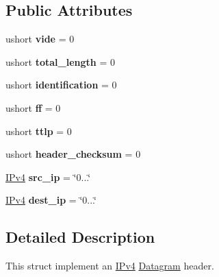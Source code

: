 \subsection*{Public Attributes}
\begin{DoxyCompactItemize}
\item 
ushort {\bfseries vide} = 0\hypertarget{structip_1_1Header_a105b752c949ecc83a6c64dec53b51e96}{}\label{structip_1_1Header_a105b752c949ecc83a6c64dec53b51e96}

\item 
ushort {\bfseries total\+\_\+length} = 0\hypertarget{structip_1_1Header_ae3ae0942baa2544afa8b86b9677ce464}{}\label{structip_1_1Header_ae3ae0942baa2544afa8b86b9677ce464}

\item 
ushort {\bfseries identification} = 0\hypertarget{structip_1_1Header_a6a1db0df8e25a4bcc0f2df9549bc30b1}{}\label{structip_1_1Header_a6a1db0df8e25a4bcc0f2df9549bc30b1}

\item 
ushort {\bfseries ff} = 0\hypertarget{structip_1_1Header_a9c79b047f8384c0e78055dda3271598f}{}\label{structip_1_1Header_a9c79b047f8384c0e78055dda3271598f}

\item 
ushort {\bfseries ttlp} = 0\hypertarget{structip_1_1Header_ad747dde10ed8db84dd6eec3e5e6e4619}{}\label{structip_1_1Header_ad747dde10ed8db84dd6eec3e5e6e4619}

\item 
ushort {\bfseries header\+\_\+checksum} = 0\hypertarget{structip_1_1Header_a9c970e995fa43b87ed6be2a7e3b7e179}{}\label{structip_1_1Header_a9c970e995fa43b87ed6be2a7e3b7e179}

\item 
\hyperlink{structIPv4}{I\+Pv4} {\bfseries src\+\_\+ip} = \char`\"{}0...\char`\"{}\hypertarget{structip_1_1Header_a0da2fcac6244ddb22e31efb81e3571a9}{}\label{structip_1_1Header_a0da2fcac6244ddb22e31efb81e3571a9}

\item 
\hyperlink{structIPv4}{I\+Pv4} {\bfseries dest\+\_\+ip} = \char`\"{}0...\char`\"{}\hypertarget{structip_1_1Header_a3609ecc70b34815e28ef2f46708fe7ee}{}\label{structip_1_1Header_a3609ecc70b34815e28ef2f46708fe7ee}

\end{DoxyCompactItemize}


\subsection{Detailed Description}
This struct implement an \hyperlink{structIPv4}{I\+Pv4} \hyperlink{structip_1_1Datagram}{Datagram} header. 


